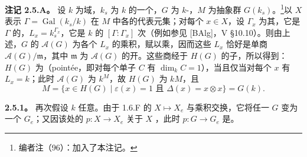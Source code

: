 \textbf{注记 2.5.A。} 设 $k$ 为域，$k_s$ 为 $k$ 的一个，$G$ 为 $k$-，$M$ 为抽象群 $G(k_s)$。\footnote{编者注（96）：加入了本注记。}以 $X$ 表示 $\Gamma=\operatorname{Gal}(k_s/k)$ 在 $M$ 中各的代表元集；对每个 $x\in X$，设 $\Gamma_x$ 为其，它是 $\Gamma$ 的，$L_x=k_s^{\Gamma_x}$，它是 $k$ 的 $[\Gamma:\Gamma_x]$ 次（例如参见 [BAlg]，V §10.10）。则由上述，$G$ 的 $\mathscr A(G)$ 为各个 $L_x$ 的乘积，赋以乘，因而这些 $L_x$ 恰好是单商 $\mathscr A(G)/\mathfrak m$，其中 $\mathfrak m$ 为 $\mathscr A(G)$ 的开。这些商经于 $H(G)$ 的子，所以得到：$H(G)$ 为（pointée，即对每个单子 $C$ 有 $\dim_k C=1$），当且仅当对每个 $x$ 有 $L_x=k$；此时 $\mathscr A(G)$ 为 $k^M$，故 $H(G)$ 为 $kM$，且
\[
M=\{x\in H(G)\mid\varepsilon(x)=1\text{ 且 }\Delta(x)=x\otimes x\}=G(k).
\]

\textbf{2.5.1。} 再次假设 $k$ 任意。由于 1.6.F 的 $X\mapsto X_e$ 与乘积交换，它将任一 $G$ 变为一个 $G_e$；又因该处的 $p:X\to X_e$ 关于 $X$ ，此时 $p:G\to G_e$ 是。

